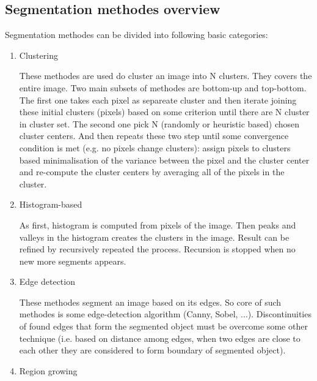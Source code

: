 \subsection{Segmentation methodes overview}

Segmentation methodes can be divided into following basic categories:

\begin{enumerate}

  \item Clustering

  These methodes are used do cluster an image into N clusters. They covers the entire image. Two main subsets of methodes are bottom-up and top-bottom. The first one takes each pixel as separeate cluster and then iterate joining these initial clusters (pixels) based on some criterion until there are N cluster in cluster set. The second one pick N (randomly or heuristic based) chosen cluster centers. And then repeats these two step until some convergence condition is met (e.g. no pixels change clusters): assign pixels to clusters based minimalisation of the variance between the pixel and the cluster center and re-compute the cluster centers by averaging all of the pixels in the cluster. 

  \item Histogram-based

  As first, histogram is computed from pixels of the image. Then peaks and valleys in the histogram creates the clusters in the image. Result can be refined by recursively repeated the process. Recursion is stopped when no new more segments appears.

  \item Edge detection

  These methodes segment an image based on its edges. So core of such methodes is some edge-detection algorithm (Canny, Sobel, ...). Discontinuities of found edges that form the segmented object must be overcome some other technique (i.e. based on distance among edges, when two edges are close to each other they are considered to form boundary of segmented object).

  \item Region growing


\end{enumerate}

